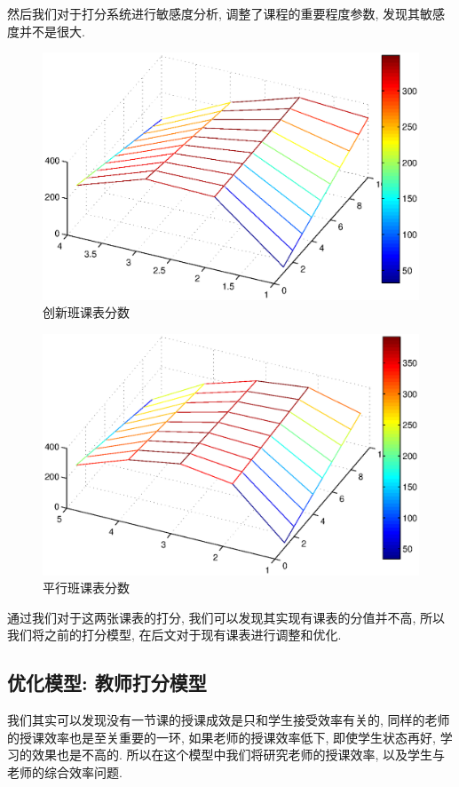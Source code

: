 \documentclass[a4paper]{article}
\begin{document}
 \clearpage
 然后我们对于打分系统进行敏感度分析, 调整了课程的重要程度参数, 发现其敏感度并不是很大.\par
 \begin{figure}[H]
 \centerline{\includegraphics[scale=0.7]{innoscore.eps}}
 \caption{创新班课表分数}
 \end{figure}
 \begin{figure}[H]
 \centerline{\includegraphics[scale=0.7]{normscore.eps}}
 \caption{平行班课表分数}
 \end{figure}
 通过我们对于这两张课表的打分, 我们可以发现其实现有课表的分值并不高, 所以我们将之前的打分模型, 在后文对于现有课表进行调整和优化.
 \clearpage
 \subsection{优化模型: 教师打分模型}
  我们其实可以发现没有一节课的授课成效是只和学生接受效率有关的, 同样的老师的授课效率也是至关重要的一环, 如果老师的授课效率低下, 即使学生状态再好, 学习的效果也是不高的. 所以在这个模型中我们将研究老师的授课效率, 以及学生与老师的综合效率问题.
\end{document}
